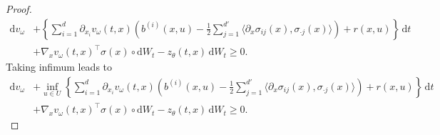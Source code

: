 \documentclass[11pt]{article}
\numberwithin{equation}{section}
\theoremstyle{plain}
\theoremstyle{definition}
\theoremstyle{remark}
\newcommand{\dd}{\mathrm{d}}
\begin{document}
\begin{proof}
\begin{equation*}
\begin{aligned}
    \dd v_\omega &+ \left\{ \sum_{i=1}^d \partial_{x_i} v_\omega(t,x)\left( b^{(i)}(x,u) - \frac{1}{2} \sum_{j=1}^{d'} \langle \partial_{x} \sigma_{ij}(x), \sigma_{\cdot j}(x)\rangle \right) + r(x,u) \right\}\,\dd t \\
    &+ \nabla_x v_\omega(t,x)^\top \sigma(x) \circ \dd W_t - z_\theta(t,x)\,\dd W_t \ge 0. 
\end{aligned}
\end{equation*}
Taking infimum leads to
\begin{equation} \label{eq:spde-1-side}
\begin{aligned}
    \dd v_\omega &+ \inf_{u\in U} \left\{ \sum_{i=1}^d \partial_{x_i} v_\omega(t,x)\left( b^{(i)}(x,u) - \frac{1}{2} \sum_{j=1}^{d'} \langle \partial_{x} \sigma_{ij}(x), \sigma_{\cdot j}(x)\rangle \right) + r(x,u) \right\}\,\dd t \\
    &+ \nabla_x v_\omega(t,x)^\top \sigma(x) \circ \dd W_t - z_\theta(t,x)\,\dd W_t \ge 0. 
\end{aligned}
\end{equation}


\end{proof}
\end{document}
